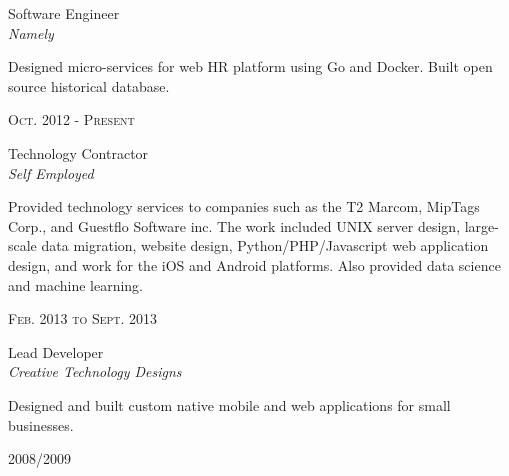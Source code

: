 \documentclass[10pt]{article} %
\begin{document}
{\begin{minipage}[t]{0.5\textwidth}
{\raggedright\large Software Engineer\\
\textit{Namely}\\[5pt]}

\small{Designed micro-services for web HR platform using Go and Docker.  Built open source historical database.}\\


{\raggedleft\textsc{Oct. 2012 - Present}\par}

{\raggedright\large Technology Contractor\\
\textit{Self Employed}\\[5pt]}

\small{Provided technology services to companies such as the T2 Marcom, MipTags Corp., and Guestflo Software inc. The work included UNIX server design, large-scale data migration, website design, Python/PHP/Javascript web application design, and work for the iOS and Android platforms.  Also provided data science and machine learning.}\\


{\raggedleft\textsc{Feb. 2013 to Sept. 2013}\par}

{\raggedright\large Lead Developer\\
\textit{Creative Technology Designs}\\[5pt]}


\small{Designed and built custom native mobile and web applications for small businesses.}\\


{\raggedleft\textsc{2008/2009}\par}


\end{minipage}}
\end{document}
